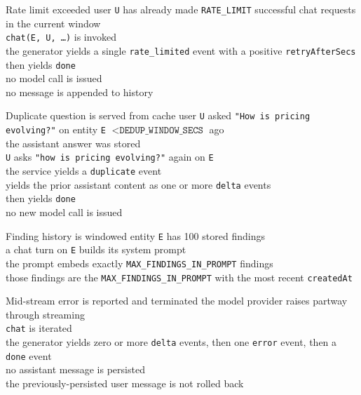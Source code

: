 \begin{scenario}{Rate limit exceeded}
\Given user \texttt{U} has already made \texttt{RATE\_LIMIT} successful chat requests in the current window \\
\When \texttt{chat(E, U, \ldots)} is invoked \\
\Then the generator yields a single \texttt{rate\_limited} event with a positive \texttt{retryAfterSecs} \\
\And then yields \texttt{done} \\
\And no model call is issued \\
\And no message is appended to history
\end{scenario}

\begin{scenario}{Duplicate question is served from cache}
\Given user \texttt{U} asked \texttt{"How is pricing evolving?"} on entity \texttt{E} $< \texttt{DEDUP\_WINDOW\_SECS}$ ago \\
\And the assistant answer was stored \\
\When \texttt{U} asks \texttt{"how is pricing evolving?"} again on \texttt{E} \\
\Then the service yields a \texttt{duplicate} event \\
\And yields the prior assistant content as one or more \texttt{delta} events \\
\And then yields \texttt{done} \\
\And no new model call is issued
\end{scenario}

\begin{scenario}{Finding history is windowed}
\Given entity \texttt{E} has 100 stored findings \\
\When a chat turn on \texttt{E} builds its system prompt \\
\Then the prompt embeds exactly \texttt{MAX\_FINDINGS\_IN\_PROMPT} findings \\
\And those findings are the \texttt{MAX\_FINDINGS\_IN\_PROMPT} with the most recent \texttt{createdAt}
\end{scenario}

\begin{scenario}{Mid-stream error is reported and terminated}
\Given the model provider raises partway through streaming \\
\When \texttt{chat} is iterated \\
\Then the generator yields zero or more \texttt{delta} events, then one \texttt{error} event, then a \texttt{done} event \\
\And no assistant message is persisted \\
\And the previously-persisted user message is not rolled back
\end{scenario}

